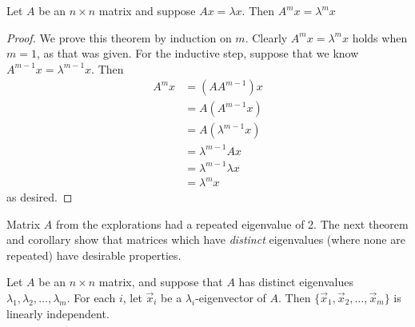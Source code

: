 \documentclass{ximera}
\begin{document}
\begin{theorem}\label{th:eigpowers}
Let $A$ be an $n \times n$ matrix and suppose $Ax=\lambda x$.  Then $A^m x = \lambda^m x$
\end{theorem}

\begin{proof}
We prove this theorem by induction on $m$.  Clearly $A^m x = \lambda^m x$ holds when $m=1$, as that was given.  For the inductive step, suppose that we know $A^{m-1} x = \lambda^{m-1} x$.  Then
\begin{align*}
    A^m x &= (A A^{m-1}) x \\
          &= A (A^{m-1} x) \\
          &= A (\lambda^{m-1} x) \\
          &= \lambda^{m-1} Ax \\
          &= \lambda^{m-1} \lambda x \\
          &= \lambda^m x
\end{align*}
as desired.
\end{proof}

Matrix $A$ from the explorations had a repeated eigenvalue of 2.  The next theorem and corollary show that matrices which have \emph{distinct} eigenvalues (where none are repeated) have desirable properties.

\begin{theorem}\label{th:linindepeigenvectors}
Let $A$ be an $n\times n$ matrix, and suppose that $A$
has distinct eigenvalues $\lambda_1, \lambda_2, \ldots, \lambda_m$.
For each $i$, let $\vec{x}_i$ be a $\lambda_i$-eigenvector of $A$.
Then $\{ \vec{x}_1, \vec{x}_2, \ldots, \vec{x}_m\}$ is
linearly independent.
\end{theorem}
\end{document}
